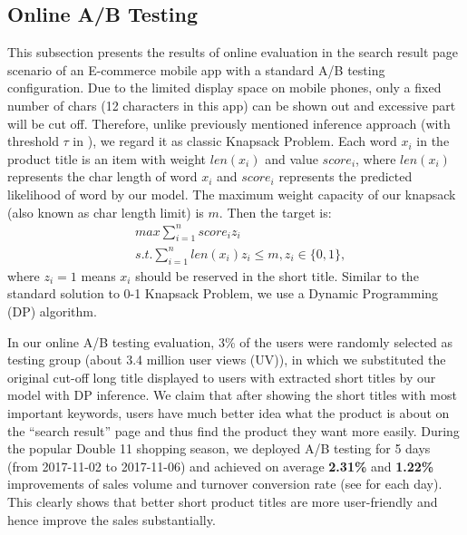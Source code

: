 \subsection{Online A/B Testing}
\label{sec:eval_online}
This subsection presents the results of online evaluation in the search result page scenario
of an E-commerce mobile app with a standard A/B testing configuration.
Due to the limited display space on mobile phones,
only a fixed number of chars (12 characters in this app) 
can be shown out and excessive part will be cut off.
Therefore, unlike previously mentioned inference approach (with threshold $\tau$ in ),
we regard it as classic Knapsack Problem.
Each word $x_i$ in the product title is an item with weight $len(x_i)$ and value $score_i$,
where $len(x_i)$ represents the char length of word $x_i$
and $score_i$ represents the predicted likelihood of word by our model.
The maximum weight capacity of our knapsack (also known as char length limit) is $m$. 
Then the target is:
\begin{eqnarray*}
& max \sum_{i=1}^{n} score_i z_i \\
& s.t. \sum_{i=1}^{n} len(x_i)z_i \le m, z_i \in \{0, 1\},
\end{eqnarray*}
where $z_i=1$ means $x_i$ should be reserved in the short title.
Similar to the standard solution to 0-1 Knapsack Problem,
we use a Dynamic Programming (DP) algorithm. %

In our online A/B testing evaluation,
3\% of the users were randomly selected as testing group (about 3.4 million user views (UV)),
in which we substituted the original cut-off long title displayed to users
with extracted short titles by our model with DP inference.
We claim that after showing the short titles with most important keywords,
users have much better idea what the product is about on the 
``search result'' page and thus find the product they want more easily.
During the popular Double 11 shopping season, 
we deployed A/B testing for 5 days (from 2017-11-02 to 2017-11-06) 
and achieved on average \textbf{2.31\%} and \textbf{1.22\%} improvements of 
sales volume and turnover conversion rate (see  for each day).
This clearly shows that better short product titles are more user-friendly
and hence improve the sales substantially.

